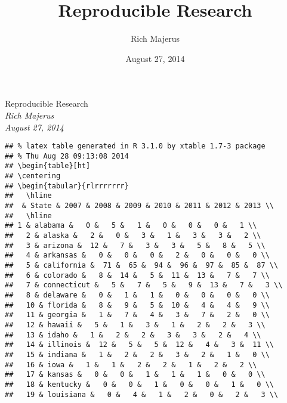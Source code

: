 \documentclass[]{article}
\title{Reproducible Research}
\author{Rich Majerus}
\date{August 27, 2014}
\begin{document}
\begin{center}
\huge Reproducible Research \\[0.2cm]
\large \emph{Rich Majerus}\\[0.1cm]
\large \emph{August 27, 2014} \\
\normalsize
\end{center}


\begin{verbatim}
## % latex table generated in R 3.1.0 by xtable 1.7-3 package
## % Thu Aug 28 09:13:08 2014
## \begin{table}[ht]
## \centering
## \begin{tabular}{rlrrrrrrr}
##   \hline
##  & State & 2007 & 2008 & 2009 & 2010 & 2011 & 2012 & 2013 \\ 
##   \hline
## 1 & alabama &   0 &   5 &   1 &   0 &   0 &   0 &   1 \\ 
##   2 & alaska &   2 &   0 &   3 &   1 &   3 &   3 &   2 \\ 
##   3 & arizona &  12 &   7 &   3 &   3 &   5 &   8 &   5 \\ 
##   4 & arkansas &   0 &   0 &   0 &   2 &   0 &   0 &   0 \\ 
##   5 & california &  71 &  65 &  94 &  96 &  97 &  85 &  87 \\ 
##   6 & colorado &   8 &  14 &   5 &  11 &  13 &   7 &   7 \\ 
##   7 & connecticut &   5 &   7 &   5 &   9 &  13 &   7 &   3 \\ 
##   8 & delaware &   0 &   1 &   1 &   0 &   0 &   0 &   0 \\ 
##   10 & florida &   8 &   9 &   5 &  10 &   4 &   4 &   9 \\ 
##   11 & georgia &   1 &   7 &   4 &   3 &   7 &   2 &   0 \\ 
##   12 & hawaii &   5 &   1 &   3 &   1 &   2 &   2 &   3 \\ 
##   13 & idaho &   1 &   2 &   2 &   3 &   3 &   2 &   4 \\ 
##   14 & illinois &  12 &   5 &   5 &  12 &   4 &   3 &  11 \\ 
##   15 & indiana &   1 &   2 &   2 &   3 &   2 &   1 &   0 \\ 
##   16 & iowa &   1 &   1 &   2 &   2 &   1 &   2 &   2 \\ 
##   17 & kansas &   0 &   0 &   1 &   1 &   1 &   0 &   0 \\ 
##   18 & kentucky &   0 &   0 &   1 &   0 &   0 &   1 &   0 \\ 
##   19 & louisiana &   0 &   4 &   1 &   2 &   0 &   2 &   3 \\ 

\end{verbatim}
\end{document}
